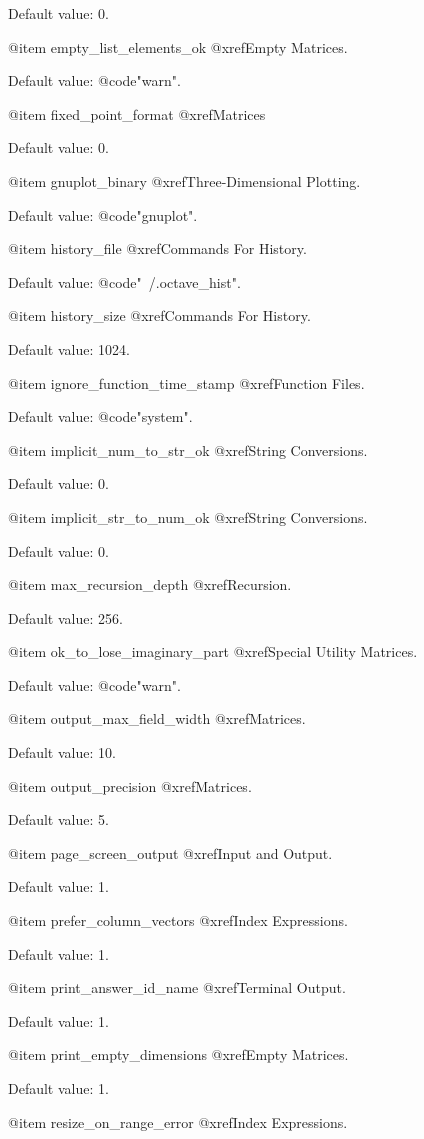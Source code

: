 Default value: 0.

@item empty_list_elements_ok
@xref{Empty Matrices}.

Default value: @code{"warn"}.

@item fixed_point_format
@xref{Matrices}

Default value: 0.

@item gnuplot_binary
@xref{Three-Dimensional Plotting}.

Default value: @code{"gnuplot"}.

@item history_file
@xref{Commands For History}.

Default value: @code{"~/.octave_hist"}.

@item history_size
@xref{Commands For History}.

Default value: 1024.

@item ignore_function_time_stamp
@xref{Function Files}.

Default value: @code{"system"}.

@item implicit_num_to_str_ok
@xref{String Conversions}.

Default value: 0.

@item implicit_str_to_num_ok
@xref{String Conversions}.

Default value: 0.

@item max_recursion_depth
@xref{Recursion}.

Default value: 256.

@item ok_to_lose_imaginary_part
@xref{Special Utility Matrices}.

Default value: @code{"warn"}.

@item output_max_field_width
@xref{Matrices}.

Default value: 10.

@item output_precision
@xref{Matrices}.

Default value: 5.

@item page_screen_output
@xref{Input and Output}.

Default value: 1.

@item prefer_column_vectors
@xref{Index Expressions}.

Default value: 1.

@item print_answer_id_name
@xref{Terminal Output}.

Default value: 1.

@item print_empty_dimensions
@xref{Empty Matrices}.

Default value: 1.

@item resize_on_range_error
@xref{Index Expressions}.

